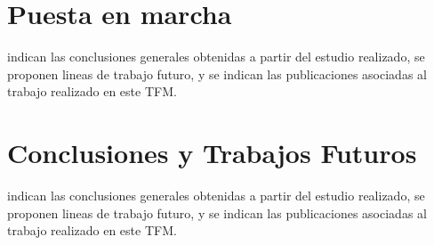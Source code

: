 \documentclass[a4paper, 12pt]{book}
\begin{document}
\cleardoublepage
\chapter{Puesta en marcha}
\label{chap:puestaEnMarcha}
indican las conclusiones generales obtenidas a partir del estudio realizado, se proponen lineas de trabajo futuro, y se indican las publicaciones asociadas al trabajo realizado en este TFM.


\cleardoublepage
\chapter{Conclusiones y Trabajos Futuros}
\label{chap:conclusiones}
indican las conclusiones generales obtenidas a partir del estudio realizado, se proponen lineas de trabajo futuro, y se indican las publicaciones asociadas al trabajo realizado en este TFM.


\cleardoublepage






\end{document}
